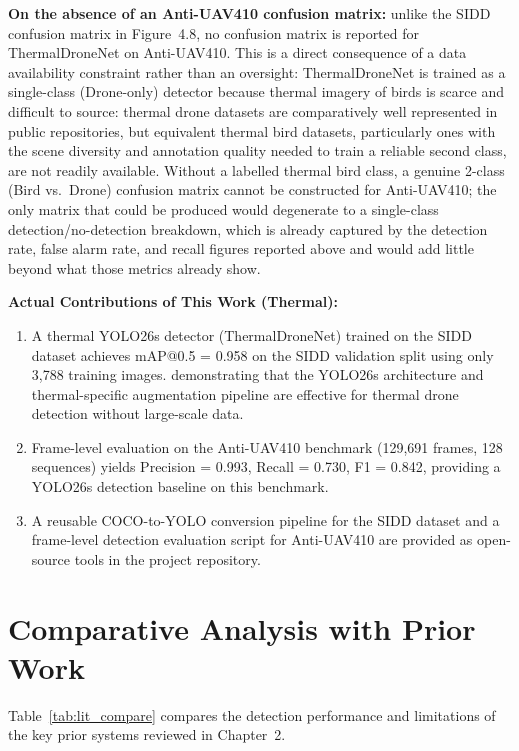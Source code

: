 \documentclass[12pt,a4paper]{report}
\begin{document}
\textbf{On the absence of an Anti-UAV410 confusion matrix:} unlike the
SIDD confusion matrix in Figure~4.8, no confusion matrix is reported for
ThermalDroneNet on Anti-UAV410. This is a direct consequence of a data
availability constraint rather than an oversight: ThermalDroneNet is
trained as a single-class (Drone-only) detector because thermal imagery of
birds is scarce and difficult to source: thermal drone datasets are
comparatively well represented in public repositories, but equivalent
thermal bird datasets, particularly ones with the scene diversity and
annotation quality needed to train a reliable second class, are not
readily available. Without a labelled thermal bird class, a genuine 2-class
(Bird vs.\ Drone) confusion matrix cannot be constructed for Anti-UAV410;
the only matrix that could be produced would degenerate to a single-class
detection/no-detection breakdown, which is already captured by the
detection rate, false alarm rate, and recall figures reported above and
would add little beyond what those metrics already show.

\textbf{Actual Contributions of This Work (Thermal):}
\begin{enumerate}
  \item A thermal YOLO26s detector (ThermalDroneNet) trained on the SIDD
        dataset achieves mAP@0.5 = 0.958 on the SIDD validation split
        using only 3,788 training images. demonstrating that the
        YOLO26s architecture and thermal-specific augmentation pipeline
        are effective for thermal drone detection without large-scale data.
  \item Frame-level evaluation on the Anti-UAV410 benchmark (129,691 frames,
        128 sequences) yields Precision = 0.993, Recall = 0.730, F1 = 0.842,
        providing a YOLO26s detection baseline on this benchmark.
  \item A reusable COCO-to-YOLO conversion pipeline for the SIDD dataset
        and a frame-level detection evaluation script for Anti-UAV410 are
        provided as open-source tools in the project repository.
\end{enumerate}

\section{Comparative Analysis with Prior Work}

Table~\ref{tab:lit_compare} compares the detection performance and limitations
of the key prior systems reviewed in Chapter~2.
\end{document}
